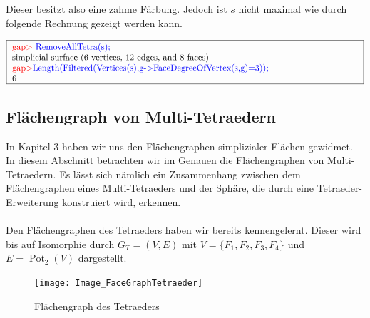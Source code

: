 \documentclass[12pt,titlepage,twoside,cleardoublepage]{article}
\theoremstyle{nummermitklammern}
\numberwithin{equation}{section}
\DeclareMathOperator{\Pot}{Pot}
\begin{document}
Dieser besitzt also eine zahme Färbung. Jedoch ist $s$ nicht maximal wie durch folgende Rechnung gezeigt werden kann.
\begin{center}
$\fbox{
\parbox{14cm}{
\textcolor{red}{gap$>$} \textcolor{blue}{RemoveAllTetra(s);}\newline
simplicial surface (6 vertices, 12 edges, and 8 faces)\newline
\textcolor{red}{gap$>$}\textcolor{blue}{ Length(Filtered(Vertices(s),g-$>$FaceDegreeOfVertex(s,g)=3));}\newline
6
}}$
\end{center}
\subsection{Flächengraph von Multi-Tetraedern}\label{factet}
In Kapitel 3 haben wir uns den Flächengraphen simplizialer Flächen gewidmet. In diesem Abschnitt betrachten wir im Genauen die Flächengraphen von Multi-Tetraedern. Es lässt sich nämlich ein Zusammenhang zwischen dem Flächengraphen eines Multi-Tetraeders und der Sphäre, die durch eine Tetraeder-Erweiterung konstruiert wird, erkennen.\\\\
Den Flächengraphen des Tetraeders haben wir bereits kennengelernt. Dieser wird bis auf Isomorphie durch $G_T=(V,E)$ mit $V=\{F_1,F_2,F_3,F_4\}$ und $E=\Pot_2(V)$ dargestellt.
\begin{figure}[H]
\begin{center}
\texttt{[image: Image\_FaceGraphTetraeder]}
\end{center}
\caption{Flächengraph des Tetraeders}
\end{figure}
\end{document}

